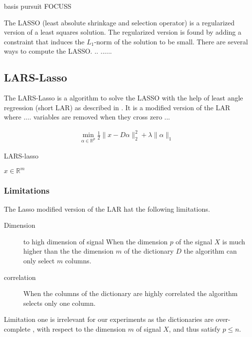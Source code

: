 basis pursuit\cite{} 
FOCUSS \cite{}

The LASSO (least absolute shrinkage and selection operator) is a regularized version of a least squares solution.
The regularized version is found by adding a constraint that induces the $L_1$-norm of the solution to be small. \cite{Tibshirani1998}
There are several ways to compute the LASSO. .. ...... \cite{} 

\subsection {LARS-Lasso}
\label{sec:lars}
The LARS-Lasso is a algorithm to solve the LASSO with the help of least angle regression (short LAR)
as described in \cite{Efron2004}. It is a modified version of the LAR where .... variables are removed when they cross zero ...


\begin{align}
\min_{\alpha\in\mathbb{R}^{p}}  \frac{1}{2} \lVert x - D\alpha \rVert^{2}_{2} + \lambda \lVert \alpha \rVert_{1}
\end{align}

\begin{algorithm}
\caption{LARS-lasso}
\begin{algorithmic}[1]
\REQUIRE $x \in \mathbb{R}^m$
\end{algorithmic}
\end{algorithm}

\subsubsection{Limitations}
The Lasso modified version of the LAR hat the following limitations.
\begin{description}
 \item[Dimension] to high dimension of signal When the dimension $p$ of the signal $X$ is 
much higher than the the dimension $m$ of the dictionary $D$ the algorithm can only select $m$ columns.

\item[correlation] When the columns of the dictionary are highly correlated the algorithm
selects only one column.
\end{description}

Limitation one is irrelevant for our experiments as the dictionaries are over-complete 
, with respect to the dimension $m$ of signal $X$, and thus satisfy $p\leq n$.






